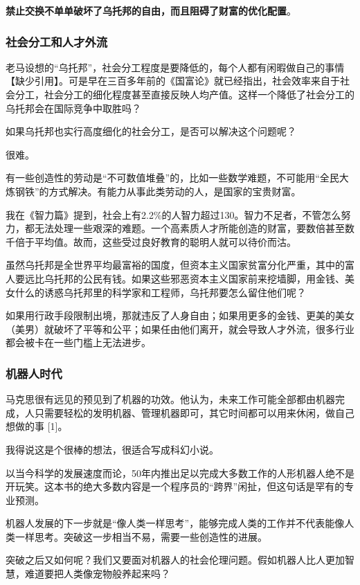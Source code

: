 \textbf{禁止交换不单单破坏了乌托邦的自由，而且阻碍了财富的优化配置}。

\subsubsection{社会分工和人才外流}

老马设想的“乌托邦”，社会分工程度是要降低的，每个人都有闲暇做自己的事情【缺少引用】。可是早在三百多年前的《国富论》就已经指出，社会效率来自于社会分工，社会分工的细化程度甚至直接反映人均产值。这样一个降低了社会分工的乌托邦会在国际竞争中取胜吗？

如果乌托邦也实行高度细化的社会分工，是否可以解决这个问题呢？

很难。

\zPar

有一些创造性的劳动是“不可数值堆叠”的，比如一些数学难题，不可能用“全民大炼钢铁”的方式解决。有能力从事此类劳动的人，是国家的宝贵财富。

我在《智力篇》提到，社会上有2.2\%的人智力超过130。智力不足者，不管怎么努力，都无法处理一些艰深的难题。一个高素质人才所能创造的财富，要数倍甚至数千倍于平均值。故而，这些受过良好教育的聪明人就可以待价而沽。

虽然乌托邦是全世界平均最富裕的国度，但资本主义国家贫富分化严重，其中的富人要远比乌托邦的公民有钱。如果这些邪恶资本主义国家前来挖墙脚，用金钱、美女什么的诱惑乌托邦里的科学家和工程师，乌托邦要怎么留住他们呢？

如果用行政手段限制出境，那就违反了人身自由；如果用更多的金钱、更美的美女（美男）就破坏了平等和公平；如果任由他们离开，就会导致人才外流，很多行业都会被卡在一些门槛上无法进步。

\subsubsection{机器人时代}

马克思很有远见的预见到了机器的功效。他认为，未来工作可能全部都由机器完成，人只需要轻松的发明机器、管理机器即可，其它时间都可以用来休闲，做自己想做的事 [1]。

我得说这是个很棒的想法，很适合写成科幻小说。

以当今科学的发展速度而论，50年内推出足以完成大多数工作的人形机器人绝不是开玩笑。这本书的绝大多数内容是一个程序员的“跨界”闲扯，但这句话是罕有的专业预测。

机器人发展的下一步就是“像人类一样思考”，能够完成人类的工作并不代表能像人类一样思考。突破这一步相当不易，需要一些创造性的进展。

突破之后又如何呢？我们又要面对机器人的社会伦理问题。假如机器人比人更加智慧，难道要把人类像宠物般养起来吗？

